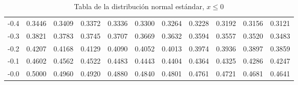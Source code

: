\begin{table}[h]
{\begin{tabular}{|T{1.1}|T{1.4}|T{1.4}|T{1.4}|T{1.4}|T{1.4}|T{1.4}|T{1.4}|T{1.4}|T{1.4}|T{1.4}|}
-0.4 & 0.3446 & 0.3409 & 0.3372 & 0.3336 & 0.3300 & 0.3264 & 0.3228 & 0.3192 & 0.3156 & 0.3121 \\
-0.3 & 0.3821 & 0.3783 & 0.3745 & 0.3707 & 0.3669 & 0.3632 & 0.3594 & 0.3557 & 0.3520 & 0.3483 \\
-0.2 & 0.4207 & 0.4168 & 0.4129 & 0.4090 & 0.4052 & 0.4013 & 0.3974 & 0.3936 & 0.3897 & 0.3859 \\
-0.1 & 0.4602 & 0.4562 & 0.4522 & 0.4483 & 0.4443 & 0.4404 & 0.4364 & 0.4325 & 0.4286 & 0.4247 \\
-0.0 & 0.5000 & 0.4960 & 0.4920 & 0.4880 & 0.4840 & 0.4801 & 0.4761 & 0.4721 & 0.4681 & 0.4641 \\
\hline
\end{tabular}
}
\caption{Tabla de la distribución normal estándar, \(x \leq 0\)}
\label{tab:normal_standard1}
\end{table}

